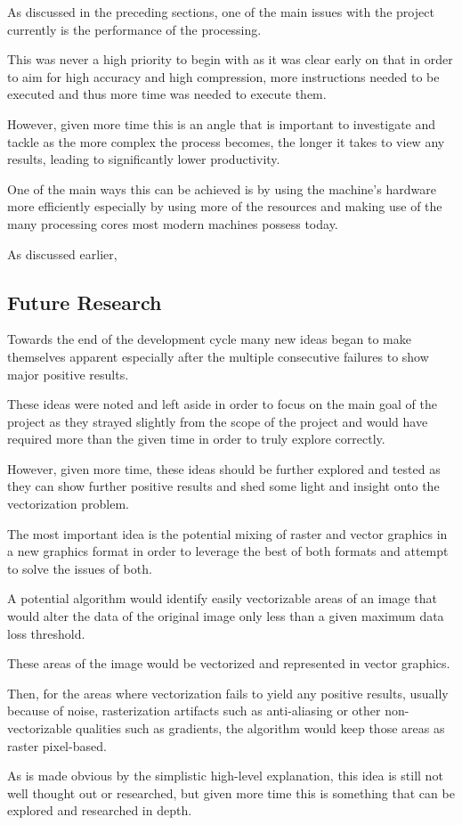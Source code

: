 \documentclass[12pt]{article}
\newcommand{\sentence}{} %
\begin{document}
    \tab
    As discussed in the preceding sections, one of the main issues with the project currently is the
    performance of the processing.
    \sentence
    This was never a high priority to begin with as it was clear early on that in order to aim for high accuracy and
    high compression, more instructions needed to be executed and thus more time was needed to execute them.
    \sentence
    However, given more time this is an angle that is important to investigate and tackle as the more complex the
    process becomes, the longer it takes to view any results, leading to significantly lower productivity.
    \sentence
    One of the main ways this can be achieved is by using the machine's hardware more efficiently especially by using
    more of the resources and making use of the many processing cores most modern machines possess today.
    \sentence
    As discussed earlier, %

    \subsection{Future Research}\label{subsec:future-research}

    \tab
    Towards the end of the development cycle many new ideas began to make themselves apparent especially
    after the multiple consecutive failures to show major positive results.
    \sentence
    These ideas were noted and left aside in order to focus on the main goal of the project as they strayed slightly
    from the scope of the project and would have required more than the given time in order to truly explore correctly.
    \sentence
    However, given more time, these ideas should be further explored and tested as they can show further positive
    results and shed some light and insight onto the vectorization problem.
    \sentence
    The most important idea is the potential mixing of raster and vector graphics in a new graphics format in order
    to leverage the best of both formats and attempt to solve the issues of both.
    \sentence
    A potential algorithm would identify easily vectorizable areas of an image that would alter the data of the
    original image only less than a given maximum data loss threshold.
    \sentence
    These areas of the image would be vectorized and represented in vector graphics.
    \sentence
    Then, for the areas where vectorization fails to yield any positive results, usually because of noise,
    rasterization artifacts such as anti-aliasing or other non-vectorizable qualities such as gradients, the
    algorithm would keep those areas as raster pixel-based.
    \sentence
    As is made obvious by the simplistic high-level explanation, this idea is still not well thought out or
    researched, but given more time this is something that can be explored and researched in depth.
\end{document}
